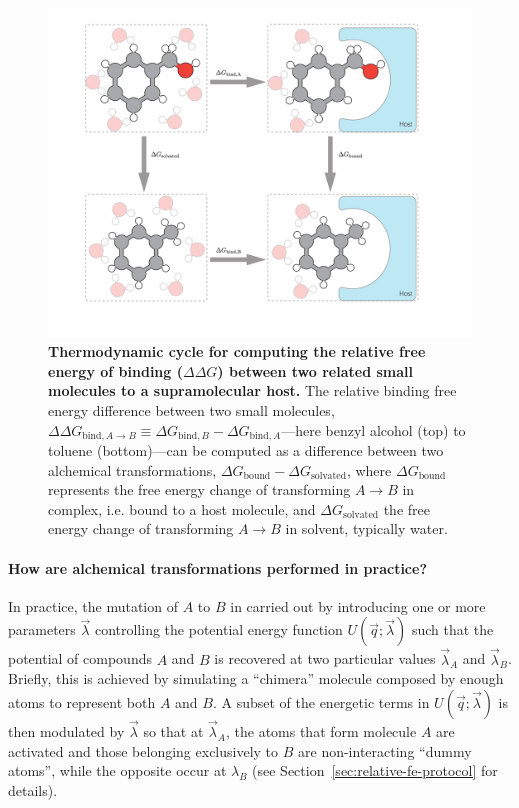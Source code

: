 \documentclass[9pt,bestpractices]{livecoms}
\begin{document}
\begin{figure}
    \includegraphics[width=0.95\linewidth]{figures/fig2_therm_cyc/Figure.pdf}
    \caption{{\bf Thermodynamic cycle for computing the relative free energy of binding ($\Delta \Delta G$) between two related small molecules to a supramolecular host.}
    The relative binding free energy difference between two small molecules, $\Delta \Delta G_{\mathrm{bind}, A \rightarrow B} \equiv \Delta G_{\mathrm{bind}, B} - \Delta G_{\mathrm{bind}, A}$---here benzyl alcohol (top) to toluene (bottom)---can be computed as a difference between two alchemical transformations, $\Delta G_\mathrm{bound} - \Delta G_\mathrm{solvated}$, where $\Delta G_\mathrm{bound}$ represents the free energy change of transforming $A \rightarrow B$ in complex, i.e. bound to a host molecule, and $\Delta G_\mathrm{solvated}$ the free energy change of transforming $A \rightarrow B$ in solvent, typically water.}
    \label{fig:fig_binding_thermodynamic_cycle}
\end{figure}

\paragraph{How are alchemical transformations performed in practice?}

In practice, the mutation of $A$ to $B$ in carried out by introducing one or more parameters $\vec{\lambda}$ controlling the potential energy function $U(\vec{q};\vec{\lambda})$ such that the potential of compounds $A$ and $B$ is recovered at two particular values $\vec{\lambda}_A$ and $\vec{\lambda}_B$.
Briefly, this is achieved by simulating a ``chimera'' molecule composed by enough atoms to represent both $A$ and $B$.
A subset of the energetic terms in $U(\vec{q};\vec{\lambda})$ is then modulated by $\vec{\lambda}$ so that at $\vec{\lambda}_A$, the atoms that form molecule $A$ are activated and those belonging exclusively to $B$ are non-interacting ``dummy atoms'', while the opposite occur at $\lambda_B$ (see Section~\ref{sec:relative-fe-protocol} for details).
\end{document}
